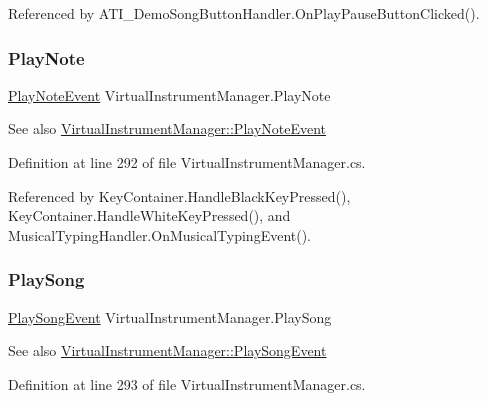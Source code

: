 Referenced by A\+T\+I\+\_\+\+Demo\+Song\+Button\+Handler.\+On\+Play\+Pause\+Button\+Clicked().

\mbox{\label{group___v_i_m_events_gaa21021c13a8c9d13cbf374d5bf9d68fa}} 
\subsubsection{\texorpdfstring{Play\+Note}{PlayNote}}
{\footnotesize\ttfamily \hyperlink{group___v_i_m_event_types_class_virtual_instrument_manager_1_1_play_note_event}{Play\+Note\+Event} Virtual\+Instrument\+Manager.\+Play\+Note}

\begin{DoxySeeAlso}{See also}
\hyperlink{group___v_i_m_event_types_class_virtual_instrument_manager_1_1_play_note_event}{Virtual\+Instrument\+Manager\+::\+Play\+Note\+Event} 
\end{DoxySeeAlso}


Definition at line 292 of file Virtual\+Instrument\+Manager.\+cs.



Referenced by Key\+Container.\+Handle\+Black\+Key\+Pressed(), Key\+Container.\+Handle\+White\+Key\+Pressed(), and Musical\+Typing\+Handler.\+On\+Musical\+Typing\+Event().

\mbox{\label{group___v_i_m_events_gae450bdba9c513ab4e43f69def50fa84d}} 
\subsubsection{\texorpdfstring{Play\+Song}{PlaySong}}
{\footnotesize\ttfamily \hyperlink{group___v_i_m_event_types_class_virtual_instrument_manager_1_1_play_song_event}{Play\+Song\+Event} Virtual\+Instrument\+Manager.\+Play\+Song}

\begin{DoxySeeAlso}{See also}
\hyperlink{group___v_i_m_event_types_class_virtual_instrument_manager_1_1_play_song_event}{Virtual\+Instrument\+Manager\+::\+Play\+Song\+Event} 
\end{DoxySeeAlso}


Definition at line 293 of file Virtual\+Instrument\+Manager.\+cs.



